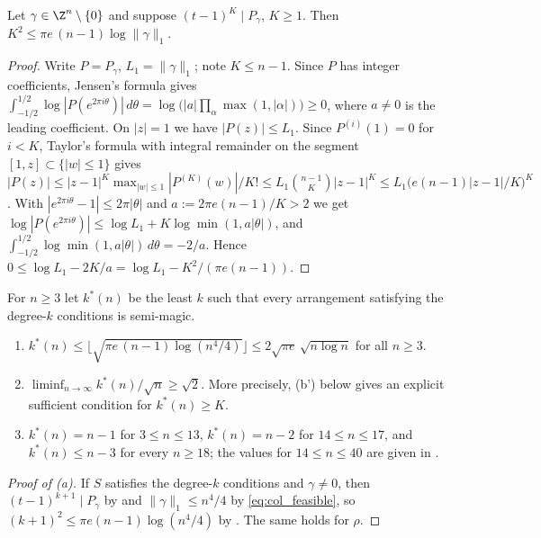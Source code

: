 \begin{lemma}
\label{lem:jensen}
Let $\gamma\in\Z^{n}\setminus\{0\}$ and suppose $(t-1)^{K}\mid P_\gamma$, $K\ge1$.  Then $K^{2}\le \pi e\,(n-1)\log\|\gamma\|_1$.
\end{lemma}

\begin{proof}
Write $P=P_\gamma$, $L_1=\|\gamma\|_1$; note $K\le n-1$.  Since $P$ has integer coefficients, Jensen's formula gives
$\int_{-1/2}^{1/2}\log|P(e^{2\pi i\theta})|\,d\theta=\log\bigl(|a|\prod_\alpha\max(1,|\alpha|)\bigr)\ge0$, where $a\ne0$ is the leading
coefficient.  On $|z|=1$ we have $|P(z)|\le L_1$.  Since $P^{(i)}(1)=0$ for $i<K$, Taylor's formula with integral remainder on the
segment $[1,z]\subset\{|w|\le1\}$ gives
$|P(z)|\le |z-1|^{K}\max_{|w|\le1}|P^{(K)}(w)|/K!\le L_1\binom{n-1}{K}|z-1|^{K}\le L_1\bigl(e(n-1)|z-1|/K\bigr)^{K}$.
With $|e^{2\pi i\theta}-1|\le2\pi|\theta|$ and $a:=2\pi e(n-1)/K>2$ we get
$\log|P(e^{2\pi i\theta})|\le\log L_1+K\log\min(1,a|\theta|)$, and
$\int_{-1/2}^{1/2}\log\min(1,a|\theta|)\,d\theta=-2/a$.  Hence $0\le\log L_1-2K/a=\log L_1-K^{2}/(\pi e(n-1))$.
\end{proof}

\begin{theorem}
\label{thm:perm_threshold}
For $n\ge3$ let $k^{*}(n)$ be the least $k$ such that every arrangement satisfying the degree-$k$ conditions is semi-magic.
\begin{enumerate}
\item[(a)] $k^{*}(n)\le\bigl\lfloor\sqrt{\pi e\,(n-1)\log(n^{4}/4)}\bigr\rfloor\le 2\sqrt{\pi e}\,\sqrt{n\log n}$ for all $n\ge3$.
\item[(b)] $\liminf_{n\to\infty}k^{*}(n)/\sqrt n\ge\sqrt2$.  More precisely, (b') below gives an explicit sufficient condition for $k^*(n)\ge K$.
\item[(c)] $k^{*}(n)=n-1$ for $3\le n\le13$, $k^{*}(n)=n-2$ for $14\le n\le17$, and $k^{*}(n)\le n-3$ for every $n\ge18$; the values for
$14\le n\le40$ are given in .
\end{enumerate}
\end{theorem}

\begin{proof}[Proof of (a)]
If $S$ satisfies the degree-$k$ conditions and $\gamma\ne0$, then $(t-1)^{k+1}\mid P_\gamma$ by  and
$\|\gamma\|_1\le n^{4}/4$ by \eqref{eq:col_feasible}, so $(k+1)^{2}\le\pi e(n-1)\log(n^{4}/4)$ by .  The same holds for
$\rho$.
\end{proof}

